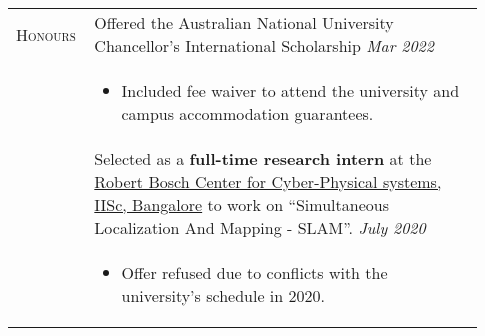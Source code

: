 \documentclass[letterpaper, 10pt, oneside]{article}
\newcommand{\stitle}[1]{\normalsize{\textsc{#1}}}
\begin{document}
\begin{longtable}{@{} p{0.13\linewidth} p{0.8\linewidth}}
    \stitle{Honours}
                         & Offered the Australian National University Chancellor's International Scholarship \hfill \textsl{Mar 2022}                                                                                           \\
                         & \parbox{0.8\textwidth}{
        \begin{itemize}[leftmargin=6ex, itemsep=-0.88ex, topsep=-0.88ex]
            \item Included fee waiver to attend the university and campus accommodation guarantees.
        \end{itemize}
    }
    \\[1.5ex]

                         & Selected as a \textbf{full-time research intern} at the
    \href{https://cps.iisc.ac.in/}{Robert Bosch Center for Cyber-Physical systems, IISc, Bangalore} to work on
    ``Simultaneous Localization And Mapping - SLAM''.
    \hfill \textsl{July 2020}                                                                                                                                                                                                   \\
                         & \parbox{0.8\textwidth}{                                                                                                                                                                              %
        \begin{itemize}[leftmargin=6ex, itemsep=-0.88ex, topsep=-0.88ex]
            \item Offer refused due to conflicts with the university's schedule in 2020.
        \end{itemize}
    }
    \\[1.5ex]


\end{longtable}
\end{document}
